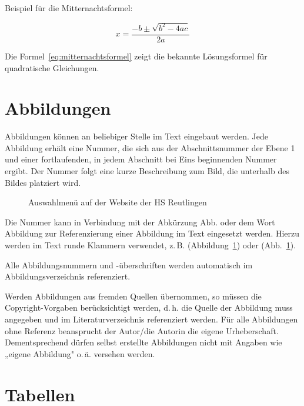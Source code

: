 Beispiel für die Mitternachtsformel:

\begin{equation}
	x = \frac{-b \pm \sqrt{b^2 - 4ac}}{2a}
	\label{eq:mitternachtsformel}
\end{equation}

Die Formel~\ref{eq:mitternachtsformel} zeigt die bekannte Lösungsformel für quadratische Gleichungen.

\section{Abbildungen}
\label{sec:abbildungen}

Abbildungen können an beliebiger Stelle im Text eingebaut werden. Jede Abbildung erhält eine Nummer, die sich aus der Abschnittsnummer der Ebene 1 und einer fortlaufenden, in jedem Abschnitt bei Eins beginnenden Nummer ergibt. Der Nummer folgt eine kurze Beschreibung zum Bild, die unterhalb des Bildes platziert wird.

\begin{figure}[h]
	\centering
	\caption{Auswahlmenü auf der Website der HS Reutlingen}
	\label{fig:hs_website}
\end{figure}

Die Nummer kann in Verbindung mit der Abkürzung Abb. oder dem Wort Abbildung zur Referenzierung einer Abbildung im Text eingesetzt werden. Hierzu werden im Text runde Klammern verwendet, z.\,B. (Abbildung~\ref{fig:hs_website}) oder (Abb.~\ref{fig:hs_website}).

Alle Abbildungsnummern und -überschriften werden automatisch im Abbildungsverzeichnis referenziert.

Werden Abbildungen aus fremden Quellen übernommen, so müssen die Copyright-Vorgaben berücksichtigt werden, d.\,h. die Quelle der Abbildung muss angegeben und im Literaturverzeichnis referenziert werden. Für alle Abbildungen ohne Referenz beansprucht der Autor/die Autorin die eigene Urheberschaft. Dementsprechend dürfen selbst erstellte Abbildungen nicht mit Angaben wie „eigene Abbildung" o.\,ä. versehen werden.

\section{Tabellen}
\label{sec:tabellen}

